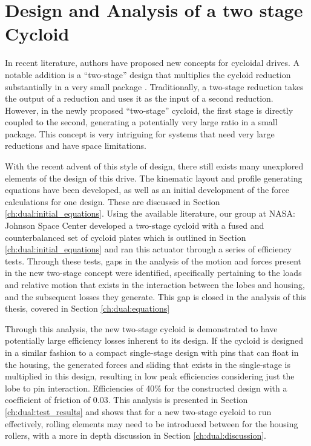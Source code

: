 
\chapter{Design and Analysis of a two stage Cycloid}\label{ch:dual}

In recent literature, authors have proposed new concepts for cycloidal drives. A notable addition is a ``two-stage'' design that multiplies the cycloid reduction substantially in a very small package \cite{ref:new_two_stage}. Traditionally, a two-stage reduction takes the output of a reduction and uses it as the input of a second reduction. However, in the newly proposed ``two-stage'' cycloid, the first stage is directly coupled to the second, generating a potentially very large ratio in a small package. This concept is very intriguing for systems that need very large reductions and have space limitations. 

With the recent advent of this style of design, there still exists many unexplored elements of the design of this drive. The kinematic layout and profile generating equations have been developed, as well as an initial development of the force calculations for one design. These are discussed in Section \ref{ch:dual:initial_equations}. Using the available literature, our group at NASA: Johnson Space Center developed a two-stage cycloid with a fused and counterbalanced set of cycloid plates which is outlined in Section \ref{ch:dual:initial_equations} and ran this actuator through a series of efficiency tests. Through these tests, gaps in the analysis of the motion and forces present in the new two-stage concept were identified, specifically pertaining to the loads and relative motion that exists in the interaction between the lobes and housing, and the subsequent losses they generate. This gap is closed in the analysis of this thesis, covered in Section \ref{ch:dual:equations}

Through this analysis, the new two-stage cycloid is demonstrated to have potentially large efficiency losses inherent to its design. If the cycloid is designed in a similar fashion to a compact single-stage design with pins that can float in the housing, the generated forces and sliding that exists in the single-stage is multiplied in this design, resulting in low peak efficiencies considering just the lobe to pin interaction. Efficiencies of 40\% for the constructed design with a coefficient of friction of 0.03. This analysis is presented in Section \ref{ch:dual:test_results} and shows that for a new two-stage cycloid to run effectively, rolling elements may need to be introduced between for the housing rollers, with a more in depth discussion in Section \ref{ch:dual:discussion}.

